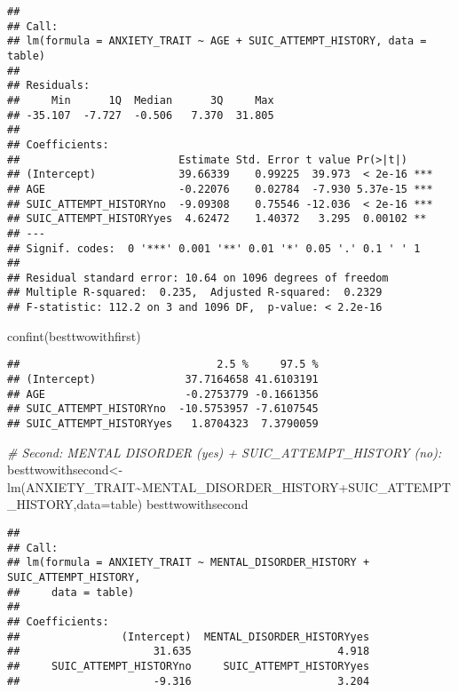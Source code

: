 \documentclass[
]{book}
\newenvironment{Shaded}{\begin{snugshade}}{\end{snugshade}}
\newcommand{\AttributeTok}[1]{\textcolor[rgb]{0.77,0.63,0.00}{#1}}
\newcommand{\CommentTok}[1]{\textcolor[rgb]{0.56,0.35,0.01}{\textit{#1}}}
\newcommand{\FunctionTok}[1]{\textcolor[rgb]{0.00,0.00,0.00}{#1}}
\newcommand{\NormalTok}[1]{#1}
\newcommand{\OtherTok}[1]{\textcolor[rgb]{0.56,0.35,0.01}{#1}}
\newcommand{\SpecialCharTok}[1]{\textcolor[rgb]{0.00,0.00,0.00}{#1}}
\begin{document}
\begin{verbatim}
## 
## Call:
## lm(formula = ANXIETY_TRAIT ~ AGE + SUIC_ATTEMPT_HISTORY, data = table)
## 
## Residuals:
##     Min      1Q  Median      3Q     Max 
## -35.107  -7.727  -0.506   7.370  31.805 
## 
## Coefficients:
##                         Estimate Std. Error t value Pr(>|t|)    
## (Intercept)             39.66339    0.99225  39.973  < 2e-16 ***
## AGE                     -0.22076    0.02784  -7.930 5.37e-15 ***
## SUIC_ATTEMPT_HISTORYno  -9.09308    0.75546 -12.036  < 2e-16 ***
## SUIC_ATTEMPT_HISTORYyes  4.62472    1.40372   3.295  0.00102 ** 
## ---
## Signif. codes:  0 '***' 0.001 '**' 0.01 '*' 0.05 '.' 0.1 ' ' 1
## 
## Residual standard error: 10.64 on 1096 degrees of freedom
## Multiple R-squared:  0.235,  Adjusted R-squared:  0.2329 
## F-statistic: 112.2 on 3 and 1096 DF,  p-value: < 2.2e-16
\end{verbatim}

\begin{Shaded}
\begin{Highlighting}[]
\FunctionTok{confint}\NormalTok{(besttwowithfirst)}
\end{Highlighting}
\end{Shaded}

\begin{verbatim}
##                               2.5 %     97.5 %
## (Intercept)              37.7164658 41.6103191
## AGE                      -0.2753779 -0.1661356
## SUIC_ATTEMPT_HISTORYno  -10.5753957 -7.6107545
## SUIC_ATTEMPT_HISTORYyes   1.8704323  7.3790059
\end{verbatim}

\begin{Shaded}
\begin{Highlighting}[]
\CommentTok{\# Second: MENTAL DISORDER (yes) + SUIC\_ATTEMPT\_HISTORY (no):}
\NormalTok{besttwowithsecond}\OtherTok{\textless{}{-}}\FunctionTok{lm}\NormalTok{(ANXIETY\_TRAIT}\SpecialCharTok{\textasciitilde{}}\NormalTok{MENTAL\_DISORDER\_HISTORY}\SpecialCharTok{+}\NormalTok{SUIC\_ATTEMPT\_HISTORY,}\AttributeTok{data=}\NormalTok{table)}
\NormalTok{besttwowithsecond}
\end{Highlighting}
\end{Shaded}

\begin{verbatim}
## 
## Call:
## lm(formula = ANXIETY_TRAIT ~ MENTAL_DISORDER_HISTORY + SUIC_ATTEMPT_HISTORY, 
##     data = table)
## 
## Coefficients:
##                (Intercept)  MENTAL_DISORDER_HISTORYyes  
##                     31.635                       4.918  
##     SUIC_ATTEMPT_HISTORYno     SUIC_ATTEMPT_HISTORYyes  
##                     -9.316                       3.204
\end{verbatim}
\end{document}
